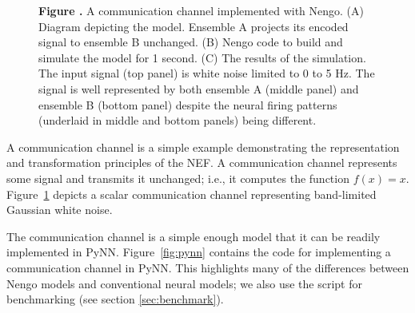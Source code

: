 \documentclass{frontiersSCNS}
\begin{document}
\begin{figure}
\begin{center}
\begin{minipage}{0.39\textwidth}
  \end{minipage}
\end{center}
 \textbf{\label{fig:comm-channel}
   Figure .}{
   A communication channel implemented with Nengo.
   (A) Diagram depicting the model. Ensemble A
   projects its encoded signal to ensemble B unchanged.
   (B) Nengo code to build and simulate the model
   for 1 second.
   (C) The results of the simulation.
   The input signal (top panel) is white noise limited to 0 to 5 Hz.
   The signal is well represented by both ensemble A (middle panel)
   and ensemble B (bottom panel) despite the neural firing patterns
   (underlaid in middle and bottom panels) being different.}
\end{figure}

A communication channel
is a simple example demonstrating
the representation and transformation principles
of the NEF.
A communication channel
represents some signal and transmits it unchanged;
i.e., it computes the function $f(x) = x$.
Figure~\ref{fig:comm-channel}
depicts a scalar communication channel
representing band-limited Gaussian white noise.

The communication channel
is a simple enough model
that it can be readily implemented in PyNN.
Figure~\ref{fig:pynn} contains the code
for implementing a communication channel in PyNN.
This highlights many of the differences
between Nengo models and conventional neural models;
we also use the script for benchmarking
(see section \ref{sec:benchmark}).
\end{document}
